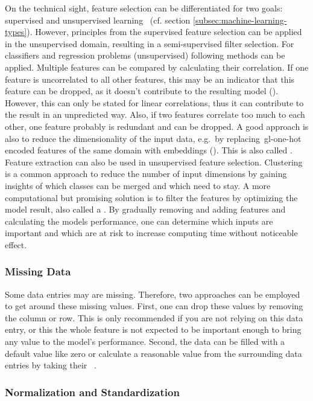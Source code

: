 On the technical sight, feature selection can be differentiated for two goals: supervised and unsupervised learning~\cite{li2017feature} (cf. section \ref{subsec:machine-learning-types}).
However, principles from the supervised feature selection can be applied in the unsupervised domain, resulting in a semi-supervised filter selection.
For classifiers and regression problems (unsupervised) following methods can be applied.
Multiple features can be compared by calculating their correlation.
If one feature is uncorrelated to all other features, this may be an indicator that this feature can be dropped, as it doesn't contribute to the resulting model ().
However, this can only be stated for linear correlations, thus it can contribute to the result in an unpredicted way.
Also, if two features correlate too much to each other, one feature probably is redundant and can be dropped.
A good approach is also to reduce the dimensionality of the input data, e.g.\ by replacing~\gls{gl-one-hot} encoded features of the same domain with embeddings ().
This is also called .
Feature extraction can also be used in unsupervised feature selection.
Clustering is a common approach to reduce the number of input dimensions by gaining insights of which classes can be merged and which need to stay.
A more computational but promising solution is to filter the features by optimizing the model result, also called a .
By gradually removing and adding features and calculating the models performance, one can determine which inputs are important and which are at risk to increase computing time without noticeable effect.

\subsubsection{Missing Data}
Some data entries may are missing.
Therefore, two approaches can be employed to get around these missing values.
First, one can drop these values by removing the column or row.
This is only recommended if you are not relying on this data entry, or this the whole feature is not expected to be important enough to bring any value to the model's performance.
Second, the data can be filled with a default value like zero or calculate a reasonable value from the surrounding data entries by taking their ~\cite{duong2021}.

\subsubsection{Normalization and Standardization}


